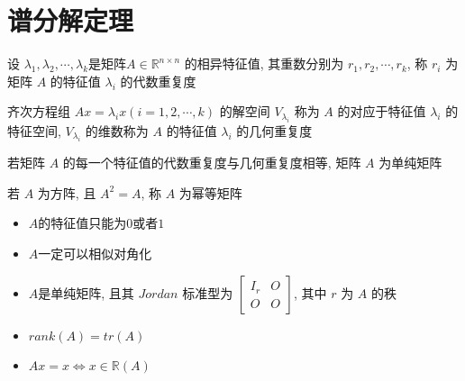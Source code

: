 \section{谱分解定理}

\begin{definition}[代数重复度]
	设 $\lambda_{1},\lambda_{2},\cdots,\lambda_{k}$是矩阵$A\in \mathbb{R}^{n\times n}$ 的相异特征值, 其重数分别为 $r_{1},r_{2},\cdots,r_{k}$,
	称 $r_{i}$ 为矩阵 $A$ 的特征值 $\lambda_{i}$ 的代数重复度
\end{definition}
\begin{definition}[几何重复度]
	齐次方程组 $Ax = \lambda_{i}x(i = 1,2,\cdots,k)$ 的解空间 $V_{\lambda_{i}}$ 称为 $A$ 的对应于特征值 $\lambda_{i}$ 的特征空间,
	$V_{\lambda_{i}}$ 的维数称为 $A$ 的特征值 $\lambda_{i}$ 的几何重复度
\end{definition}
\begin{definition}[单纯矩阵]
	若矩阵 $A$ 的每一个特征值的代数重复度与几何重复度相等, 矩阵 $A$ 为单纯矩阵
\end{definition}
\begin{definition}[幂等矩阵]
	若 $A$ 为方阵, 且 $A^2=A$, 称 $A$ 为幂等矩阵
\end{definition}
\begin{corollary}[幂等矩阵 $A$ 性质]
	\begin{itemize}
		\item $A$的特征值只能为$0$或者$1$
		\item $A$一定可以相似对角化
		\item $A$是单纯矩阵, 且其 $Jordan$ 标准型为 $\begin{bmatrix}
			I_{r} & O \\ O & O
		\end{bmatrix}$, 其中 $r$ 为 $A$ 的秩
		\item $rank(A) = tr(A)$
		\item $Ax = x\Leftrightarrow x\in\mathbb{R}(A)$
	\end{itemize}
\end{corollary}
